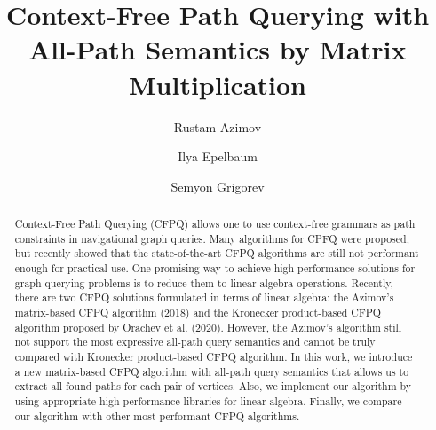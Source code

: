 \documentclass[sigconf,edbt,table]{acmart-edbt2021}
\begin{document}
\title{Context-Free Path Querying with All-Path Semantics by Matrix Multiplication}

\author{Rustam Azimov}

\author{Ilya Epelbaum}

\author{Semyon Grigorev}

\renewcommand{\shortauthors}{Rustam Azimov et al.}


\begin{abstract}
	Context-Free Path Querying (CFPQ) allows one to use context-free grammars as path constraints in navigational graph queries. Many algorithms for CPFQ were proposed, but recently showed that the state-of-the-art CFPQ algorithms are still not performant enough for practical use. One promising way to achieve high-performance solutions for graph querying problems is to reduce them to linear algebra operations. Recently, there are two CFPQ solutions formulated in terms of linear algebra: the Azimov's matrix-based CFPQ algorithm (2018) and the Kronecker product-based CFPQ algorithm proposed by Orachev et al. (2020). However, the Azimov's algorithm still not support the most expressive all-path query semantics and cannot be truly compared with Kronecker product-based CFPQ algorithm. In this work, we introduce a new matrix-based CFPQ algorithm with all-path query semantics that allows us to extract all found paths for each pair of vertices. Also, we implement our algorithm by using appropriate high-performance libraries for linear algebra. Finally, we compare our algorithm with other most performant CFPQ algorithms.
\end{abstract}
\end{document}
